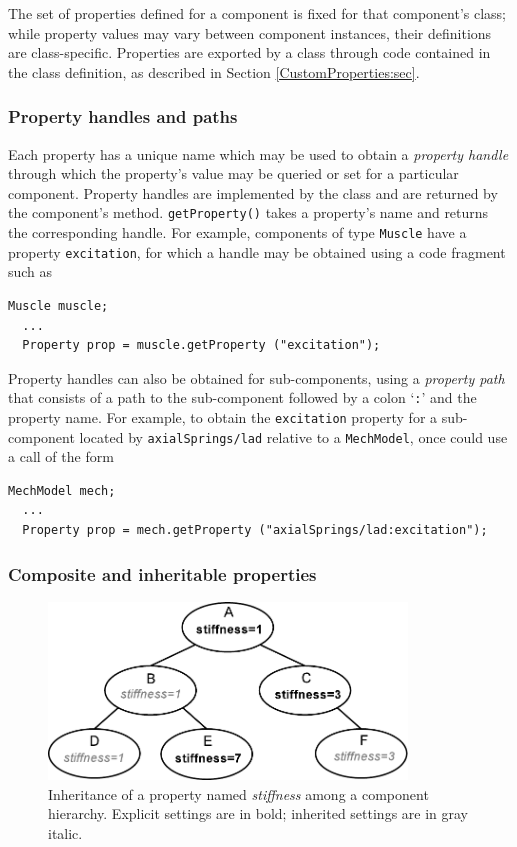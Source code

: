 The set of properties defined for a component is fixed for that
component's class; while property values may vary between component
instances, their definitions are class-specific.  
Properties are exported by a class through code contained in the class
definition, as described in Section \ref{CustomProperties:sec}.

\subsubsection{Property handles and paths}
\label{PropertyHandlesAndPaths:sec}

Each property has a unique name which may be used to obtain a {\it
property handle} through which the property's value may be queried or
set for a particular component. Property handles are implemented by
the class  and are returned by
the component's
 method.
{\tt getProperty()} takes a property's name and returns the
corresponding handle. For example, components of type {\tt Muscle}
have a property {\tt excitation}, for which a handle
may be obtained using a code fragment such as
\begin{lstlisting}[]
  Muscle muscle; 
  ...
  Property prop = muscle.getProperty ("excitation");
\end{lstlisting}
Property handles can also be obtained for
sub-components, using a {\it property path} that consists
of a path to the sub-component followed by a colon
`{\tt :}' and the property name. For example,
to obtain the {\tt excitation} property for a sub-component
located by {\tt axialSprings/lad} relative to a {\tt MechModel},
once could use a call of the form
\begin{lstlisting}[]
  MechModel mech;
  ...
  Property prop = mech.getProperty ("axialSprings/lad:excitation");
\end{lstlisting}

\subsubsection{Composite and inheritable properties}
\label{CompositeInheritableProperties:sec}

\begin{figure}[t]
\begin{center}
 \includegraphics[width=3.75in]{images/inheritedProperties}
\end{center}
\caption{Inheritance of a property named {\it stiffness} among
a component hierarchy. Explicit settings are in bold; inherited settings
are in gray italic.}
\label{inheritedProperties:fig}
\end{figure}

